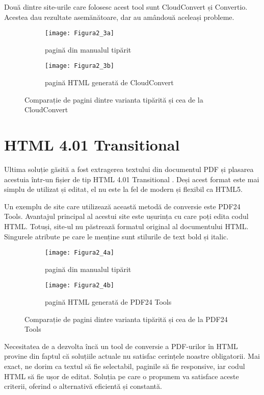 Două dintre site-urile care folosesc acest tool sunt CloudConvert și Convertio. Acestea dau rezultate asemănătoare, dar au amândouă aceleași probleme.
\begin{figure}[H]
	\centering
	\begin{subfigure}{.5\textwidth}
		\centering
		\texttt{[image: Figura2\_3a]}
		\caption{pagină din manualul tipărit}
		\label{fig:Figura2_3a}
	\end{subfigure}%
	\begin{subfigure}{.5\textwidth}
		\centering
		\texttt{[image: Figura2\_3b]}
		\caption{pagină HTML generată de CloudConvert}
		\label{fig:Figura2_3b}
	\end{subfigure}
	\caption{Comparație de pagini dintre varianta tipărită și cea de la CloudConvert}
	\label{fig:Figura2_3}
\end{figure}


\section{HTML 4.01 Transitional}

Ultima soluție găsită a fost extragerea textului din documentul PDF și plasarea acestuia într-un fișier de tip HTML 4.01 Transitional \cite{raggett1997html}. Deși acest format este mai simplu de utilizat și editat, el nu este la fel de modern și flexibil ca HTML5.

Un exemplu de site care utilizează această metodă de conversie este PDF24 Tools. Avantajul principal al acestui site este ușurința cu care poți edita codul HTML. Totuși, site-ul nu păstrează formatul original al documentului HTML. Singurele atribute pe care le menține sunt stilurile de text bold și italic.
\begin{figure}[H]
	\centering
	\begin{subfigure}{.5\textwidth}
		\centering
		\texttt{[image: Figura2\_4a]}
		\caption{pagină din manualul tipărit}
		\label{fig:Figura2_4a}
	\end{subfigure}%
	\begin{subfigure}{.5\textwidth}
		\centering
		\texttt{[image: Figura2\_4b]}
		\caption{pagină HTML generată de PDF24 Tools}
		\label{fig:Figura2_4b}
	\end{subfigure}
	\caption{Comparație de pagini dintre varianta tipărită și cea de la PDF24 Tools}
	\label{fig:Figura2_4}
\end{figure}
\smallskip

Necesitatea de a dezvolta încă un tool de conversie a PDF-urilor în HTML provine din faptul că soluțiile actuale nu satisfac cerințele noastre obligatorii. Mai exact, ne dorim ca textul să fie selectabil, paginile să fie responsive, iar codul HTML să fie ușor de editat. Soluția pe care o propunem va satisface aceste criterii, oferind o alternativă eficientă și constantă.